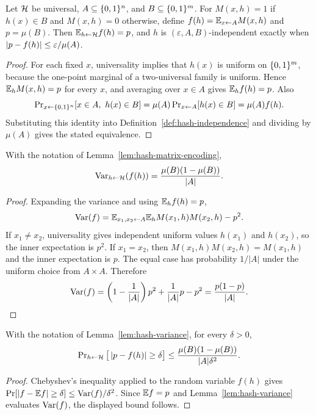 \begin{lemma}
  \label{lem:hash-matrix-encoding}
  Let $\mathcal{H}$ be universal, $A \subseteq \{0,1\}^n$, and $B \subseteq \{0,1\}^m$.
  For $M(x,h)=1$ if $h(x)\in B$ and $M(x,h)=0$ otherwise, define
  $f(h)=\mathbb{E}_{x \leftarrow A}M(x,h)$ and $p=\mu(B)$. Then
  $\mathbb{E}_{h \leftarrow \mathcal{H}}f(h)=p$, and $h$ is
  $(\varepsilon,A,B)$-independent exactly when
  $\left|p-f(h)\right|\le \varepsilon/\mu(A)$.
\end{lemma}
\begin{proof}
  For each fixed $x$, universality implies that $h(x)$ is uniform on
  $\{0,1\}^m$, because the one-point marginal of a two-universal family is
  uniform. Hence $\mathbb{E}_h M(x,h)=p$ for every $x$, and averaging over
  $x \in A$ gives $\mathbb{E}_h f(h)=p$. Also
  \[
    \operatorname{Pr}_{x \leftarrow \{0,1\}^n}[x\in A,\ h(x)\in B]
    =\mu(A)\operatorname{Pr}_{x \leftarrow A}[h(x)\in B]=\mu(A)f(h).
  \]
  Substituting this identity into Definition~\ref{def:hash-independence} and
  dividing by $\mu(A)$ gives the stated equivalence.
\end{proof}

\begin{lemma}
  \label{lem:hash-variance}
  With the notation of Lemma~\ref{lem:hash-matrix-encoding},
  \[
    \operatorname{Var}_{h \leftarrow \mathcal{H}}(f(h))=\frac{\mu(B)(1-\mu(B))}{|A|}.
  \]
\end{lemma}
\begin{proof}
  Expanding the variance and using $\mathbb{E}_h f(h)=p$,
  \[
    \operatorname{Var}(f)=\mathbb{E}_{x_1,x_2 \leftarrow A}\mathbb{E}_h M(x_1,h)M(x_2,h)-p^2 .
  \]
  If $x_1 \ne x_2$, universality gives independent uniform values
  $h(x_1)$ and $h(x_2)$, so the inner expectation is $p^2$. If $x_1=x_2$,
  then $M(x_1,h)M(x_2,h)=M(x_1,h)$ and the inner expectation is $p$. The equal
  case has probability $1/|A|$ under the uniform choice from $A \times A$.
  Therefore
  \[
    \operatorname{Var}(f)=\left(1-\frac1{|A|}\right)p^2+\frac1{|A|}p-p^2
    =\frac{p(1-p)}{|A|}.
  \]
\end{proof}

\begin{lemma}
  \label{lem:hash-chebyshev}
  With the notation of Lemma~\ref{lem:hash-variance}, for every $\delta>0$,
  \[
    \operatorname{Pr}_{h \leftarrow \mathcal{H}}\big[\left|p-f(h)\right|\ge \delta\big]
    \le \frac{\mu(B)(1-\mu(B))}{|A|\delta^2}.
  \]
\end{lemma}
\begin{proof}
  Chebyshev's inequality applied to the random variable $f(h)$ gives
  $\operatorname{Pr}[\left|f-\mathbb{E} f\right|\ge\delta]\le \operatorname{Var}(f)/\delta^2$. Since
  $\mathbb{E} f=p$ and Lemma~\ref{lem:hash-variance} evaluates $\operatorname{Var}(f)$, the displayed
  bound follows.
\end{proof}

